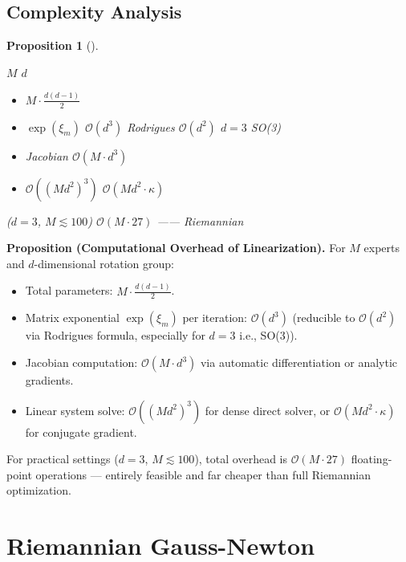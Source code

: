 \documentclass[11pt,a4paper]{article}
\theoremstyle{plain}
\newtheorem{proposition}[theorem]{Proposition}
\theoremstyle{definition}
\theoremstyle{remark}
\begin{document}
\subsection{}
\subsection*{Complexity Analysis}

\begin{proposition}[]
\label{prop:complexity}

 $M$  $d$ 
\begin{itemize}
  \item $M \cdot \frac{d(d-1)}{2}$
  \item  $\exp(\xi_m)$ $\mathcal{O}(d^3)$
        Rodrigues  $\mathcal{O}(d^2)$ $d=3$  SO(3)
  \item Jacobian $\mathcal{O}(M \cdot d^3)$
  \item $\mathcal{O}((M d^2)^3)$ 
         $\mathcal{O}(M d^2 \cdot \kappa)$ 
\end{itemize}

 ($d=3$, $M \lesssim 100$) $\mathcal{O}(M \cdot 27)$
—— Riemannian 
\end{proposition}

\bigskip
\noindent
\textbf{Proposition (Computational Overhead of Linearization).}
For $M$ experts and $d$-dimensional rotation group:
\begin{itemize}
  \item Total parameters: $M \cdot \frac{d(d-1)}{2}$.
  \item Matrix exponential $\exp(\xi_m)$ per iteration: $\mathcal{O}(d^3)$
        (reducible to $\mathcal{O}(d^2)$ via Rodrigues formula, especially
        for $d=3$ i.e., SO(3)).
  \item Jacobian computation: $\mathcal{O}(M \cdot d^3)$ via automatic
        differentiation or analytic gradients.
  \item Linear system solve: $\mathcal{O}((M d^2)^3)$ for dense direct
        solver, or $\mathcal{O}(M d^2 \cdot \kappa)$ for conjugate gradient.
\end{itemize}

For practical settings ($d=3$, $M \lesssim 100$), total overhead is
$\mathcal{O}(M \cdot 27)$ floating-point operations — entirely feasible
and far cheaper than full Riemannian optimization.

\section{Riemannian Gauss-Newton }
\end{document}
